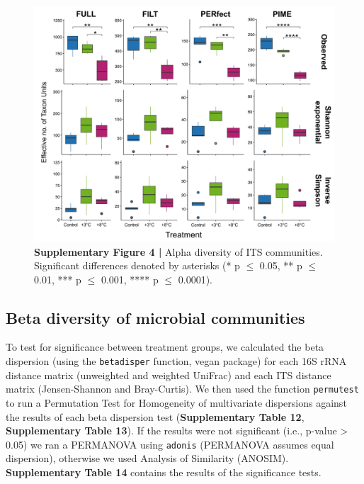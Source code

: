 \documentclass[
  10pt,
  letterpaper,
  DIV=11,
  numbers=noendperiod]{scrartcl}
\begin{document}
\begin{figure}

{\centering \includegraphics[width=1\textwidth,height=\textheight]{FIGURES/its_supp_alpha_div.png}

}

\caption{\textbf{Supplementary Figure 4 |} Alpha diversity of ITS
communities. Significant differences denoted by asterisks (* p \(\le\)
0.05, ** p \(\le\) 0.01, *** p \(\le\) 0.001, **** p \(\le\) 0.0001).}

\end{figure}

\newpage{}

\hypertarget{beta-diversity-of-microbial-communities}{%
\subsection{Beta diversity of microbial
communities}\label{beta-diversity-of-microbial-communities}}

To test for significance between treatment groups, we calculated the
beta dispersion (using the \texttt{betadisper} function, vegan package)
for each 16S rRNA distance matrix (unweighted and weighted UniFrac) and
each ITS distance matrix (Jensen-Shannon and Bray-Curtis). We then used
the function \texttt{permutest} to run a Permutation Test for
Homogeneity of multivariate dispersions against the results of each beta
dispersion test (\textbf{Supplementary Table 12}, \textbf{Supplementary
Table 13}). If the results were not significant (i.e., p-value
\textgreater{} 0.05) we ran a PERMANOVA using \texttt{adonis} (PERMANOVA
assumes equal dispersion), otherwise we used Analysis of Similarity
(ANOSIM). \textbf{Supplementary Table 14} contains the results of the
significance tests.
\end{document}
